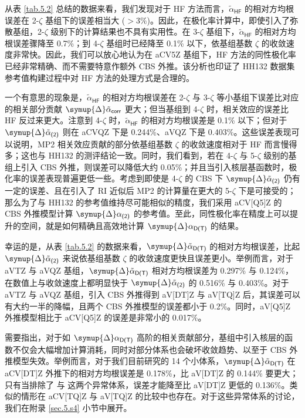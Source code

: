 从表 \ref{tab.5.2} 总结的数据来看，我们发现对于 HF 方法而言，$\tilde \alpha_\textsf{HF}$ 的相对方均根误差在 2-$\zeta$ 基组下的误差相当大 ($> 3\%$)。因此，在极化率计算中，即使引入了弥散基组，2-$\zeta$ 级别下的计算结果也不具有实用性。在 3-$\zeta$ 基组下，$\tilde \alpha_\textsf{HF}$ 的相对方均根误差骤降至 0.7\%；到 4-$\zeta$ 基组时已经降至 0.1\% 以下，依基组基数 $\zeta$ 的收敛速度非常快。因此，我们可以放心地认为在 aCV5Z 基组下，HF 方法的同性极化率已经非常精确、而不需要特意作额外 CBS 外推。该分析也印证了 HH132 数据集参考值构建过程中对 HF 方法的处理方式是合理的\cite{Hait-Head-Gordon.PCCP.2018}。

一个有意思的现象是，$\tilde \alpha_\textsf{HF}$ 的相对方均根误差在 2-$\zeta$ 与 3-$\zeta$ 等小基组下误差比对应的相关部分贡献 $\symup{\Delta} \tilde \alpha_\textsf{corr}$ 更大；但当基组到 4-$\zeta$ 时，相关效应的误差比 HF 反过来更大。注意到 4-$\zeta$ 时，$\tilde \alpha_\textsf{HF}$ 的相对方均根误差是 0.1\% 以下；但对于 $\symup{\Delta} \tilde \alpha_\textsf{(2)}$ 则在 aCVQZ 下是 0.244\%、aVQZ 下是 0.403\%。这些误差表现可以说明，MP2 相关效应贡献的部分依基组基数 $\zeta$ 的收敛速度相对于 HF 而言慢得多；这也与 HH132 的测评结论一致\cite{Hait-Head-Gordon.PCCP.2018}。同时，我们看到，若在 4-$\zeta$ 与 5-$\zeta$ 级别的基组上引入 CBS 外推，则误差可以降低大约 0.05\%；并且当引入核层基函数时，极化率的误差表现普遍更低一些。考虑到即使是 4-$\zeta$ 的 CBS 下 $\symup{\Delta} \tilde \alpha_\textsf{(2)}$ 仍有一定的误差、且在引入了 RI 近似后 MP2 的计算量在更大的 5-$\zeta$ 下是可接受的；那么为了与 HH132 的参考值维持尽可能相似的精度，我们采用 aCV[Q5]Z 的 CBS 外推模型计算 $\symup{\Delta} \alpha_\textsf{(2)}$ 的参考值。至此，同性极化率在精度上可以提升的空间，就是如何精确且高效地计算 $\symup{\Delta} \alpha_\textsf{D(T)}$ 的结果。

幸运的是，从表 \ref{tab.5.2} 的数据来看，$\symup{\Delta} \tilde \alpha_\textsf{D(T)}$ 的相对方均根误差，比起 $\symup{\Delta} \tilde \alpha_\textsf{(2)}$ 来说依基组基数 $\zeta$ 的收敛速度更快且误差更小。举例而言，对于 aVTZ 与 aVQZ 基组，$\symup{\Delta} \tilde \alpha_\textsf{D(T)}$ 相对方均根误差为 0.297\% 与 0.124\%，在数值上与收敛速度上都明显快于 $\symup{\Delta} \tilde \alpha_\textsf{(2)}$ 的 0.516\% 与 0.403\%。对于 aVTZ 与 aVQZ 基组，引入 CBS 外推得到 aV[DT]Z 与 aV[TQ]Z 后，其误差可以有大约一半的降幅，且两个 CBS 外推模型的误差都小于 0.2\%。同时，aV[Q5]Z 外推模型相比于 aCV[Q5]Z 的误差是非常小的 0.017\%。

需要指出，对于如 $\symup{\Delta} \alpha_\textsf{D(T)}$ 高阶的相关贡献部分，基组中引入核层的函数不仅会大幅增加计算消耗，同时对部分体系也会破坏收敛趋势、以至于 CBS 外推模型失效。举例而言，对于我们目前研究的 14 个小体系，$\symup{\Delta} \tilde \alpha_\textsf{D(T)}$ 在 aCV[DT]Z 外推下的相对方均根误差是 0.178\%，比 aV[DT]Z 的 0.144\% 要更大；只有当排除了  与  这两个异常体系，误差才能降至比 aV[DT]Z 更低的 0.136\%。类似的情形在 aCV[TQ]Z 与 aV[TQ]Z 的比较中也存在。对于这些异常体系的讨论，我们在附录 \ref{sec.5.s4} 小节中展开。

